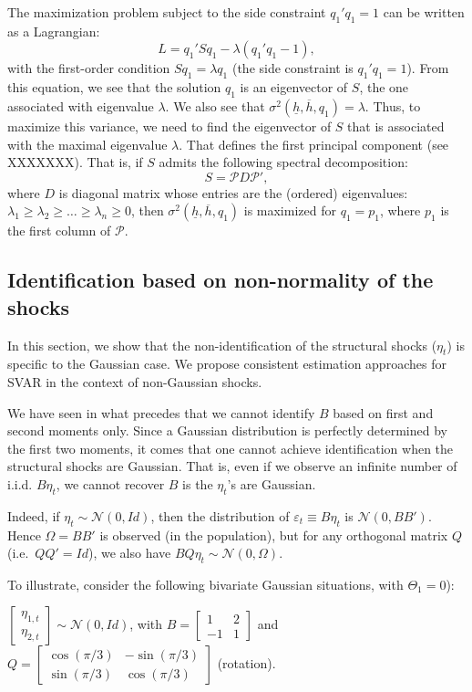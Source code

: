 \documentclass[
  12pt,
]{book}
\theoremstyle{definition}
\theoremstyle{definition}
\theoremstyle{definition}
\theoremstyle{definition}
\theoremstyle{remark}
\begin{document}
The maximization problem subject to the side constraint \(q_1'q_1=1\) can be written as a Lagrangian: \[
L=q_1'Sq_1-\lambda(q_1'q_1-1),
\]
with the first-order condition \(Sq_1=\lambda q_1\) (the side constraint is \(q_1'q_1=1\)). From this equation, we see that the solution \(q_1\) is an eigenvector of \(S\), the one associated with eigenvalue \(\lambda\). We also see that \(\sigma^2(\underline{h},\overline{h},q_1)=\lambda\). Thus, to maximize this variance, we need to find the eigenvector of \(S\) that is associated with the maximal eigenvalue \(\lambda\). That defines the first principal component (see XXXXXXX). That is, if \(S\) admits the following spectral decomposition:
\[
S = \mathcal{P}D\mathcal{P}',
\]
where \(D\) is diagonal matrix whose entries are the (ordered) eigenvalues: \(\lambda_1 \ge \lambda_2 \ge \dots \ge \lambda_n \ge 0\), then \(\sigma^2(\underline{h},\overline{h},q_1)\) is maximized for \(q_1 = p_1\), where \(p_1\) is the first column of \(\mathcal{P}\).

\hypertarget{NonGaussian}{%
\subsection{Identification based on non-normality of the shocks}\label{NonGaussian}}

In this section, we show that the non-identification of the structural shocks (\(\eta_t\)) is specific to the Gaussian case. We propose consistent estimation approaches for SVAR in the context of non-Gaussian shocks.

We have seen in what precedes that we cannot identify \(B\) based on first and second moments only. Since a Gaussian distribution is perfectly determined by the first two moments, it comes that one cannot achieve identification when the structural shocks are Gaussian. That is, even if we observe an infinite number of i.i.d. \(B \eta_t\), we cannot recover \(B\) is the \(\eta_t\)'s are Gaussian.

Indeed, if \(\eta_t \sim \mathcal{N}(0,Id)\), then the distribution of \(\varepsilon_t \equiv B \eta_t\) is \(\mathcal{N}(0,BB')\). Hence \(\Omega = B B'\) is observed (in the population), but for any orthogonal matrix \(Q\) (i.e.~\(QQ'=Id\)), we also have \(BQ \eta_t \sim \mathcal{N}(0,\Omega)\).

To illustrate, consider the following bivariate Gaussian situations, with \(\Theta_1=0\)):

\(\left[\begin{array}{c}\eta_{1,t}\\ \eta_{2,t}\end{array}\right]\sim \mathcal{N}(0,Id)\), with
\(B = \left[\begin{array}{cc} 1 & 2 \\ -1 & 1 \end{array}\right]\) and
\(Q = \left[\begin{array}{cc} \cos(\pi/3) & -\sin(\pi/3) \\ \sin(\pi/3) & \cos(\pi/3) \end{array}\right]\) (rotation).
\end{document}
